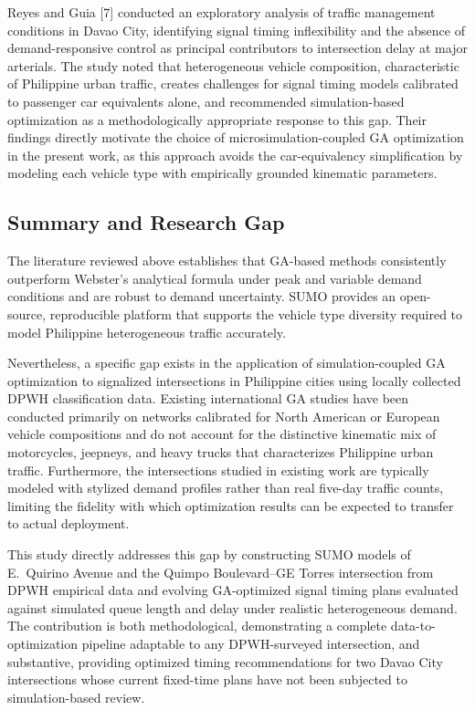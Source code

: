 \documentclass[a4paper,10pt]{article}
\begin{document}
	Reyes and Guia [7] conducted an exploratory analysis of traffic management conditions in Davao City, identifying signal timing inflexibility and the absence of demand-responsive control as principal contributors to intersection delay at major arterials. The study noted that heterogeneous vehicle composition, characteristic of Philippine urban traffic, creates challenges for signal timing models calibrated to passenger car equivalents alone, and recommended simulation-based optimization as a methodologically appropriate response to this gap. Their findings directly motivate the choice of microsimulation-coupled GA optimization in the present work, as this approach avoids the car-equivalency simplification by modeling each vehicle type with empirically grounded kinematic parameters.
	
	\subsection{Summary and Research Gap}
	
	The literature reviewed above establishes that GA-based methods consistently outperform Webster's analytical formula under peak and variable demand conditions and are robust to demand uncertainty. SUMO provides an open-source, reproducible platform that supports the vehicle type diversity required to model Philippine heterogeneous traffic accurately.
	
	Nevertheless, a specific gap exists in the application of simulation-coupled GA optimization to signalized intersections in Philippine cities using locally collected DPWH classification data. Existing international GA studies have been conducted primarily on networks calibrated for North American or European vehicle compositions and do not account for the distinctive kinematic mix of motorcycles, jeepneys, and heavy trucks that characterizes Philippine urban traffic. Furthermore, the intersections studied in existing work are typically modeled with stylized demand profiles rather than real five-day traffic counts, limiting the fidelity with which optimization results can be expected to transfer to actual deployment.
	
	This study directly addresses this gap by constructing SUMO models of E.~Quirino Avenue and the Quimpo Boulevard--GE Torres intersection from DPWH empirical data and evolving GA-optimized signal timing plans evaluated against simulated queue length and delay under realistic heterogeneous demand. The contribution is both methodological, demonstrating a complete data-to-optimization pipeline adaptable to any DPWH-surveyed intersection, and substantive, providing optimized timing recommendations for two Davao City intersections whose current fixed-time plans have not been subjected to simulation-based review.
	
\end{document}

